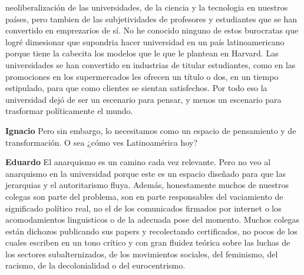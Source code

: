 \documentclass[
  spanish,
  11pt,
  a4paper,
]{scrbook}
\newenvironment{transcripcion}{
    \begin{list}{}{
        \setlength{\leftmargin}{1.5em}  %
        \setlength{\rightmargin}{0em}
        \setlength{\itemsep}{0.2em}     %
        \setlength{\parsep}{0.0em}
        \setlength{\listparindent}{0pt}
    }
}{
    \end{list}
}
\newcommand{\personaje}[1]{\textbf{#1}\quad}
\begin{document}
\begin{transcripcion}
neoliberalización de las universidades, de la ciencia y la tecnologia en nuestros países, pero tambien de las subjetividades de profesores y estudiantes que se han convertido en emprezarios de sí. No he conocido ninguno de estos burocratas que logré dimesionar que supondria hacer universidad en un país latinoamericano porque tiene la cabecita los modelos que le que le plantean en Harvard. Las universidades se han convertido en industrias de titular estudiantes, como en las promociones en los supermercados les ofrecen un título o dos, en un tiempo estipulado, para que como clientes se sientan satisfechos. Por todo eso la universidad dejó de ser un escenario para pensar, y menos un escenario para trasformar políticamente el mundo.

\item \personaje{Ignacio} Pero sin embargo, lo necesitamos como un espacio de pensamiento y de transformación. O sea ¿cómo ves Latinoamérica hoy?

\item \personaje{Eduardo} El anarquismo es un camino cada vez relevante. Pero no veo al anarquismo en la universidad porque este es un espacio diseñado para que las jerarquias y el autoritarismo fluya. Además, honestamente muchos de nuestros colegas son parte del problema, son en parte responsables del vaciamiento de significado político real, no el de los comunicados firmados por internet o los acomodamientos linguisticos o de la adecuada pose del momento. Muchos colegas están dichozos publicando sus papers y recolectando certificados, no pocos de los cuales escriben en un tono crítico y con gran fluidez teórica sobre las luchas de los sectores subalternizados, de los movimientos sociales, del feminismo, del racismo, de la decolonialidad o del eurocentrismo.


\end{transcripcion}
\end{document}
